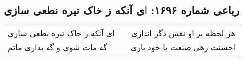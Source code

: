 \begin{center}
\section*{رباعی شماره ۱۶۹۶: ای آنکه ز خاک تیره نطعی سازی}
\label{sec:1696}
\begin{longtable}{l p{0.5cm} r}
ای آنکه ز خاک تیره نطعی سازی
&&
هر لحظه بر او نقش دگر اندازی
\\
گه مات شوی و گه بداری ماتم
&&
احسنت زهی صنعت با خود بازی
\\
\end{longtable}
\end{center}
